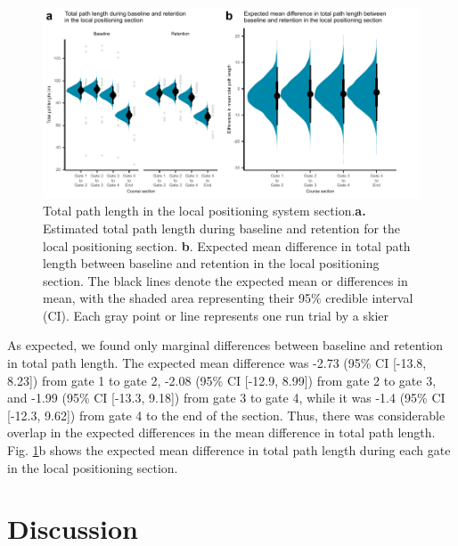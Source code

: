 \documentclass{article}
\begin{document}
\begin{figure}[H]
\centering
\includegraphics{figurer/figure_path.pdf}
\caption{Total path length in the local positioning system section.\textbf{a.} Estimated total path length during baseline and retention for the local positioning section. \textbf{b}. Expected mean difference in total path length between baseline and retention in the local positioning section. The black lines denote the expected mean or differences in mean, with the shaded area representing their 95\% credible interval (CI). Each gray point or line represents one run trial by a skier}\label{fig: path}
\end{figure}

As expected, we found only marginal differences between baseline and retention in total path length. The expected mean difference was -2.73 (95\% CI [-13.8, 8.23]) from gate 1 to gate 2, -2.08 (95\% CI [-12.9, 8.99]) from gate 2 to gate 3, and -1.99 (95\% CI [-13.3, 9.18]) from gate 3 to gate 4, while it was -1.4 (95\% CI [-12.3, 9.62]) from gate 4 to the end of the section. Thus, there was considerable overlap in the expected differences in the mean difference in total path length. Fig. \ref{fig: path}b shows the expected mean difference in total path length during each gate in the local positioning section.

\section{Discussion}
\end{document}
